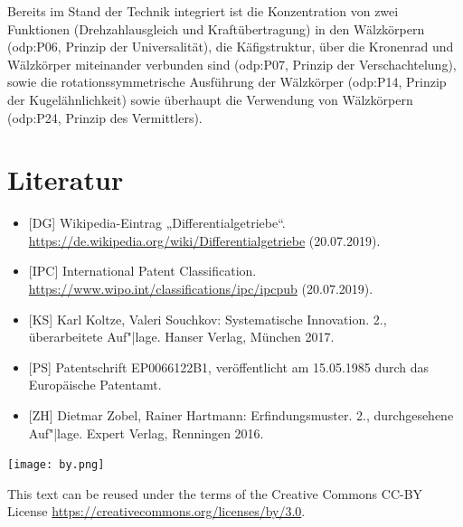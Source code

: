 \documentclass[11pt,a4paper]{article}
\newcommand{\ccnotice}{\vfill
  \begin{minipage}{.22\textwidth}\centering
    \texttt{[image: by.png]}
  \end{minipage}\hfill\begin{minipage}{.77\textwidth}
  This text can be reused under the terms of the Creative Commons CC-BY
  License \url{https://creativecommons.org/licenses/by/3.0}.
  \end{minipage}
}
\begin{document}
Bereits im Stand der Technik integriert ist die Konzentration von zwei
Funktionen (Drehzahlausgleich und Kraftübertragung) in den Wälzkörpern
(odp:P06, Prinzip der Universalität), die Käfigstruktur, über die Kronenrad
und Wälzkörper miteinander verbunden sind (odp:P07, Prinzip der
Verschachtelung), sowie die rotationssymmetrische Ausführung der Wälzkörper
(odp:P14, Prinzip der Kugelähnlichkeit) sowie überhaupt die Verwendung von
Wälzkörpern (odp:P24, Prinzip des Vermittlers).

\section{Literatur}
\raggedright
\begin{itemize}
\item {[DG]} Wikipedia-Eintrag „Differentialgetriebe“.
  \url{https://de.wikipedia.org/wiki/Differentialgetriebe} (20.07.2019).
\item {[IPC]} International Patent Classification.
  \url{https://www.wipo.int/classifications/ipc/ipcpub} (20.07.2019).
\item{[KS]} Karl Koltze, Valeri Souchkov: Systematische Innovation. 2.,
  überarbeitete Auf"|lage. Hanser Verlag, München 2017.
\item{[PS]} Patentschrift EP0066122B1, veröffentlicht am 15.05.1985 durch das
  Europäische Patentamt. 
\item{[ZH]} Dietmar Zobel, Rainer Hartmann: Erfindungsmuster. 2.,
  durchgesehene Auf"|lage. Expert Verlag, Renningen 2016.
\end{itemize}

   
\vfill
\ccnotice
\end{document}
